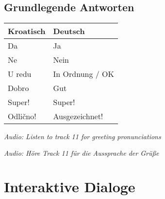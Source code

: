 \begin{vocabulary}
\subsection*{Grundlegende Antworten}

\begin{center}
\begin{tabular}{ll}
\toprule
Kroatisch & Deutsch \\
\midrule
Da & Ja \\
Ne & Nein \\
U redu & In Ordnung / OK \\
Dobro & Gut \\
Super! & Super! \\
Odlično! & Ausgezeichnet! \\
\bottomrule
\end{tabular}
\end{center}

\textit{Audio: Listen to track 11 for greeting pronunciations}

\textit{Audio: Höre Track 11 für die Aussprache der Grüße}
\end{vocabulary}

\section{Interaktive Dialoge}

